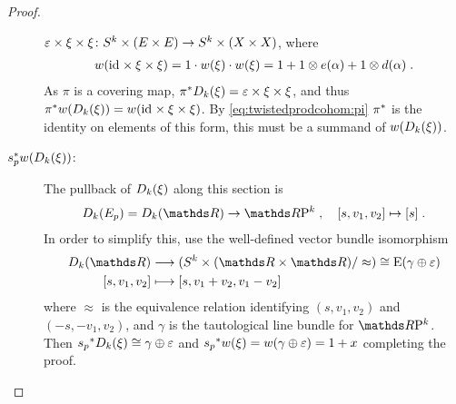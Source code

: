 \begin{Cor}
\begin{proof}
\begin{description}
      $\varepsilon\times\xi\times\xi\colon
      S^{k}\times(E\times E)\to S^{k}\times(X\times X)$, where
      \begin{gather*}
        {w}(\mathrm{id}_{}\times\xi\times\xi)
        = 1\cdot {w}(\xi)\cdot{w}(\xi)
        = 1 + 1\otimes e(\alpha) + 1\otimes d(\alpha)
        \;.
      \end{gather*}
      As $\pi$ is a covering map,
      ${\pi}^*D_{k}({\xi})=\varepsilon\times\xi\times\xi$,
      and thus
      ${\pi}^*{w}(D_{k}({\xi}))={w}(\mathrm{id}_{}\times\xi\times\xi)$.
      By \eqref{eq:twistedprodcohom:pi} ${\pi}^*$ is the identity on
      elements of this form, this must be a summand of
      ${w}(D_{k}({\xi}))$.
    \item[${s}^*_p {w}(D_{k}({\xi}))$:]
        The pullback of $D_{k}({\xi})$ along this section is
        \begin{gather*}
          \Twistedprod{k}{E_p}=\Twistedprod{k}{\R}\to \RP k
          \;,\quad
          [s, v_1,v_2] \mapsto [s]
          \;.
        \end{gather*}
        In order to simplify this, use the well-defined vector bundle
        isomorphism
        \begin{align*}
          \Twistedprod{k}{\R}
          &\longto
            (\Twistedprodcovspace{k}{\R}/\approx)
            \cong \E{(\gamma\oplus\trivbdl)} \\
          [s, v_1, v_2]
          &\longmapsto
            [s, v_1+v_2, v_1-v_2]
        \end{align*}
        where $\approx$ is the equivalence relation identifying
        $(s,v_1,v_2)$ and $(-s,-v_1,v_2)$, and
        $\gamma$ is the tautological line bundle for $\RP k$.
        Then ${s_p}^*D_{k}({\xi}) \cong
        \gamma\oplus\varepsilon$ and ${s_p}^*{w}(\xi) =
        {w}(\gamma\oplus\varepsilon) = 1+x$ completing the proof.
      \end{description}
    \end{proof}
\end{Cor}

